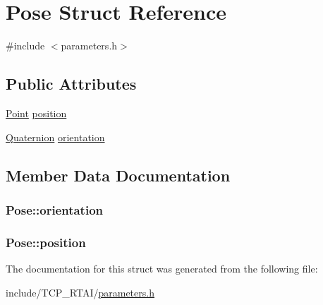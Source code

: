 \hypertarget{structPose}{
\section{Pose Struct Reference}
\label{structPose}
}


{\ttfamily \#include $<$parameters.h$>$}

\subsection*{Public Attributes}
\begin{DoxyCompactItemize}
\item 
\hyperlink{structPoint}{Point} \hyperlink{structPose_a8ff01a04aab1debcf8ab300d7824e048}{position}
\item 
\hyperlink{structQuaternion}{Quaternion} \hyperlink{structPose_a14593d2447cb6a2bc1a37cf26b5b9ccd}{orientation}
\end{DoxyCompactItemize}


\subsection{Member Data Documentation}
\hypertarget{structPose_a14593d2447cb6a2bc1a37cf26b5b9ccd}{
\subsubsection[{orientation}]{ {\bf Pose::orientation}}}
\label{structPose_a14593d2447cb6a2bc1a37cf26b5b9ccd}
\hypertarget{structPose_a8ff01a04aab1debcf8ab300d7824e048}{
\subsubsection[{position}]{ {\bf Pose::position}}}
\label{structPose_a8ff01a04aab1debcf8ab300d7824e048}


The documentation for this struct was generated from the following file:\begin{DoxyCompactItemize}
\item 
include/TCP\_\-RTAI/\hyperlink{include_2TCP__RTAI_2parameters_8h}{parameters.h}\end{DoxyCompactItemize}
